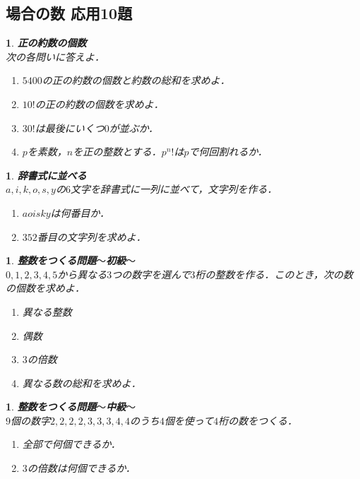 \documentclass[10pt,
fleqn,
dvipdfmx,
uplatex
]{jsarticle}
\newtheorem{question}[Question]{}
\begin{document}
\subsection{場合の数 応用10題}



\begin{question}{\bf\boldmath 正の約数の個数}\\
次の各問いに答えよ．
\begin{enumerate}
\item ${5400}$の正の約数の個数と約数の総和を求めよ．
\item ${10}!$の正の約数の個数を求めよ．
\item ${30}!$は最後にいくつ$0$が並ぶか．
\item $p$を素数，$n$を正の整数とする．$p^n!$は$p$で何回割れるか．
\end{enumerate}

\end{question}



\begin{question}{\bf\boldmath 辞書式に並べる}\\
$a, i, k, o, s, y$の$6$文字を辞書式に一列に並べて，文字列を作る．
\begin{enumerate}
\item $aoisky$は何番目か．
\item ${352}$番目の文字列を求めよ．
\end{enumerate}

\end{question}



\begin{question}{\bf\boldmath 整数をつくる問題$〜$初級$〜$}\\
$0, 1, 2, 3, 4, 5$から異なる$3$つの数字を選んで$3$桁の整数を作る．このとき，次の数の個数を求めよ．
\begin{enumerate}
\item 異なる整数
\item 偶数
\item $3$の倍数
\item 異なる数の総和を求めよ．
\end{enumerate}

\end{question}



\begin{question}{\bf\boldmath 整数をつくる問題$〜$中級$〜$}\\
$9$個の数字$2, 2, 2, 2, 3, 3, 3, 4, 4$のうち$4$個を使って$4$桁の数をつくる．
\begin{enumerate}
\item 全部で何個できるか．
\item $3$の倍数は何個できるか．
\end{enumerate}

\end{question}
\end{document}
